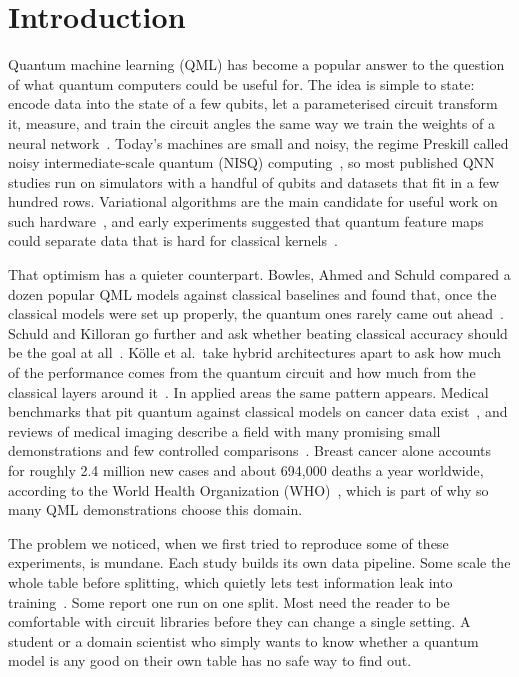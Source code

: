 \documentclass[12pt,onecolumn,draftclsnofoot]{IEEEtran}
\begin{document}
\section{Introduction}
Quantum machine learning (QML) has become a popular answer to the question of what quantum computers could be useful for. The idea is simple to state: encode data into the state of a few qubits, let a parameterised circuit transform it, measure, and train the circuit angles the same way we train the weights of a neural network~\cite{schuld2020circuit}. Today's machines are small and noisy, the regime Preskill called noisy intermediate-scale quantum (NISQ) computing~\cite{preskill2018nisq}, so most published QNN studies run on simulators with a handful of qubits and datasets that fit in a few hundred rows. Variational algorithms are the main candidate for useful work on such hardware~\cite{cerezo2021variational}, and early experiments suggested that quantum feature maps could separate data that is hard for classical kernels~\cite{havlicek2019supervised}.

That optimism has a quieter counterpart. Bowles, Ahmed and Schuld compared a dozen popular QML models against classical baselines and found that, once the classical models were set up properly, the quantum ones rarely came out ahead~\cite{bowles2024better}. Schuld and Killoran go further and ask whether beating classical accuracy should be the goal at all~\cite{schuld2022advantage}. K\"olle et al.\ take hybrid architectures apart to ask how much of the performance comes from the quantum circuit and how much from the classical layers around it~\cite{kolle2023disentangling}. In applied areas the same pattern appears. Medical benchmarks that pit quantum against classical models on cancer data exist~\cite{leither2026oncology}, and reviews of medical imaging describe a field with many promising small demonstrations and few controlled comparisons~\cite{shahriyar2025medical}. Breast cancer alone accounts for roughly 2.4 million new cases and about 694,000 deaths a year worldwide, according to the World Health Organization (WHO)~\cite{who2024breast}, which is part of why so many QML demonstrations choose this domain.

The problem we noticed, when we first tried to reproduce some of these experiments, is mundane. Each study builds its own data pipeline. Some scale the whole table before splitting, which quietly lets test information leak into training~\cite{kaufman2012leakage}. Some report one run on one split. Most need the reader to be comfortable with circuit libraries before they can change a single setting. A student or a domain scientist who simply wants to know whether a quantum model is any good on their own table has no safe way to find out.
\end{document}
